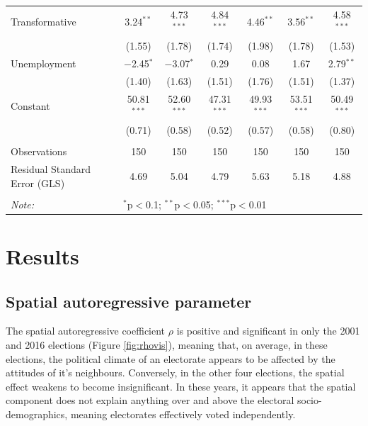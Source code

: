 \documentclass[11pt,a4paper,]{article}
\begin{document}
\begin{table}[!htbp]
\begin{tabular}{@{\extracolsep{1pt}}lcccccc}
 Transformative & 3.24$^{**}$ & 4.73$^{***}$ & 4.84$^{***}$ & 4.46$^{**}$ & 3.56$^{**}$ & 4.58$^{***}$ \\
  & (1.55) & (1.78) & (1.74) & (1.98) & (1.78) & (1.53) \\

 Unemployment & $-$2.45$^{*}$ & $-$3.07$^{*}$ & 0.29 & 0.08 & 1.67 & 2.79$^{**}$ \\
  & (1.40) & (1.63) & (1.51) & (1.76) & (1.51) & (1.37) \\

 Constant & 50.81$^{***}$ & 52.60$^{***}$ & 47.31$^{***}$ & 49.93$^{***}$ & 53.51$^{***}$ & 50.49$^{***}$ \\
  & (0.71) & (0.58) & (0.52) & (0.57) & (0.58) & (0.80) \\

\hline \\[-1.8ex]
Observations & 150 & 150 & 150 & 150 & 150 & 150 \\
Residual Standard Error (GLS) & 4.69 & 5.04 & 4.79 & 5.63 & 5.18 & 4.88 \\
\hline
\hline \\[-1.8ex]
\textit{Note:}  & \multicolumn{6}{l}{$^{*}$p$<$0.1; $^{**}$p$<$0.05; $^{***}$p$<$0.01} \\
\end{tabular}
\end{table}

\newpage

\hypertarget{results}{%
\section{Results}\label{results}}

\hypertarget{spatial-autoregressive-parameter}{%
\subsection{Spatial autoregressive parameter}\label{spatial-autoregressive-parameter}}

The spatial autoregressive coefficient \(\rho\) is positive and significant in only the 2001 and 2016 elections (Figure \ref{fig:rhovis}), meaning that, on average, in these elections, the political climate of an electorate appears to be affected by the attitudes of it's neighbours. Conversely, in the other four elections, the spatial effect weakens to become insignificant. In these years, it appears that the spatial component does not explain anything over and above the electoral socio-demographics, meaning electorates effectively voted independently.
\end{document}
